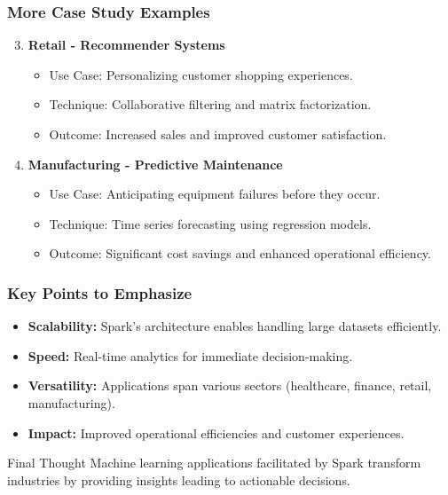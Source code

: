 \documentclass[aspectratio=169]{beamer}
\begin{document}
\begin{frame}[fragile]
    \frametitle{More Case Study Examples}
    
    \begin{enumerate}
        \setcounter{enumi}{2}
        \item \textbf{Retail - Recommender Systems}
        \begin{itemize}
            \item Use Case: Personalizing customer shopping experiences.
            \item Technique: Collaborative filtering and matrix factorization.
            \item Outcome: Increased sales and improved customer satisfaction.
        \end{itemize}

        \item \textbf{Manufacturing - Predictive Maintenance}
        \begin{itemize}
            \item Use Case: Anticipating equipment failures before they occur.
            \item Technique: Time series forecasting using regression models.
            \item Outcome: Significant cost savings and enhanced operational efficiency.
        \end{itemize}
    \end{enumerate}
\end{frame}

\begin{frame}[fragile]
    \frametitle{Key Points to Emphasize}
    
    \begin{itemize}
        \item \textbf{Scalability:} Spark's architecture enables handling large datasets efficiently.
        \item \textbf{Speed:} Real-time analytics for immediate decision-making.
        \item \textbf{Versatility:} Applications span various sectors (healthcare, finance, retail, manufacturing).
        \item \textbf{Impact:} Improved operational efficiencies and customer experiences.
    \end{itemize}
    
    \begin{block}{Final Thought}
        Machine learning applications facilitated by Spark transform industries by providing insights leading to actionable decisions.
    \end{block}
\end{frame}
\end{document}
